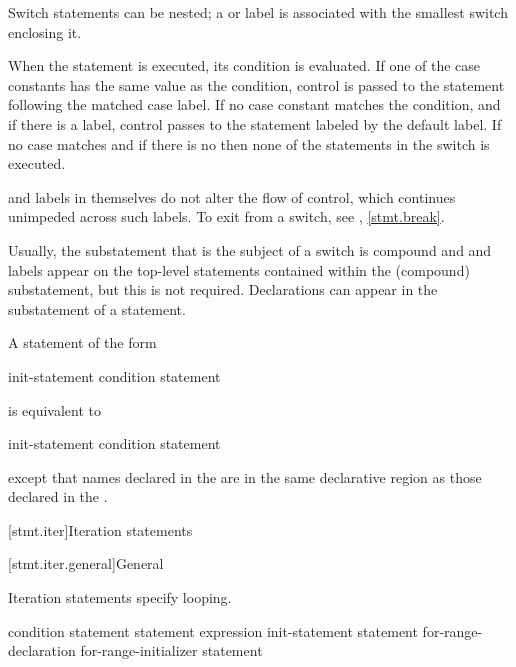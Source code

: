 \pnum
Switch statements can be nested; a  or  label
is associated with the smallest switch enclosing it.

\pnum
When the  statement is executed, its condition is
evaluated.
%
If one of the case constants has the same value as the condition,
control is passed to the statement following the matched case label. If
no case constant matches the condition, and if there is a
%
 label, control passes to the statement labeled by the
default label. If no case matches and if there is no 
then none of the statements in the switch is executed.

\pnum
{} and  labels in themselves do not alter the
flow of control, which continues unimpeded across such labels. To exit
from a switch, see , \ref{stmt.break}.
\begin{note}
Usually, the substatement that is the subject of a switch is compound
and  and  labels appear on the top-level
statements contained within the (compound) substatement, but this is not
required.
%
Declarations can appear in the substatement of a
 statement.
\end{note}

\pnum
A  statement of the form
\begin{ncsimplebnf}
 \terminal{(} init-statement condition \terminal{)} statement
\end{ncsimplebnf}
is equivalent to
\begin{ncsimplebnf}
\terminal{\{}\br
\bnfindent init-statement\br
\bnfindent {} \terminal{(} condition \terminal{)} statement\br
\terminal{\}}
\end{ncsimplebnf}
except that names declared in the  are in
the same declarative region as those declared in the
.%

[stmt.iter]{Iteration statements}%

[stmt.iter.general]{General}%

\pnum
Iteration statements specify looping.

%
%
%
%
\begin{bnf}
\br
     \terminal{(} condition \terminal{)} statement\br
     statement  \terminal{(} expression \terminal{)} \terminal{;}\br
     \terminal{(} init-statement  \terminal{;}  \terminal{)} statement\br
     \terminal{(}  for-range-declaration \terminal{:} for-range-initializer \terminal{)} statement
\end{bnf}


